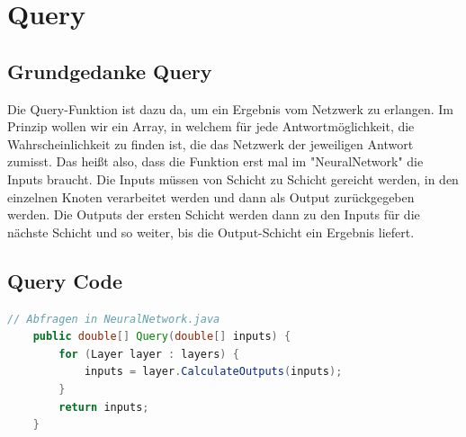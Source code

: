 \documentclass[12pt]{article}
\begin{document}
\section{Query}\subsection{Grundgedanke Query}Die Query-Funktion ist dazu da, um ein Ergebnis vom Netzwerk zu erlangen. Im Prinzip wollen wir ein Array, in welchem für jede Antwortmöglichkeit, die Wahrscheinlichkeit zu finden ist, die das Netzwerk der jeweiligen Antwort zumisst. 
Das heißt also, dass die Funktion erst mal im "NeuralNetwork" die Inputs braucht. Die Inputs müssen von Schicht zu Schicht gereicht werden, in den einzelnen Knoten verarbeitet werden und dann als Output zurückgegeben werden. Die Outputs der ersten Schicht werden dann zu den Inputs für die nächste Schicht und so weiter, bis die Output-Schicht ein Ergebnis liefert.\subsection{Query Code}\begin{lstlisting}[language=Java]
// Abfragen in NeuralNetwork.java
    public double[] Query(double[] inputs) {
        for (Layer layer : layers) {
            inputs = layer.CalculateOutputs(inputs);
        }
        return inputs;
    }
\end{lstlisting}
\end{document}
